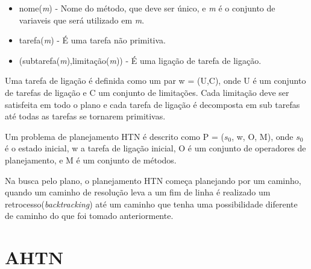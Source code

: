 \begin{itemize}
	\item nome(\textit{m}) - Nome do método, que deve ser único, e \textit{m} é o conjunto de variaveis que será utilizado em \textit{m}. 
	\item tarefa(\textit{m}) - É uma tarefa não primitiva.
	\item (subtarefa(\textit{m}),limitação(\textit{m})) - É uma ligação de tarefa de ligação.
\end{itemize}

Uma tarefa de ligação é definida como um par w = (U,C), onde U é um conjunto de tarefas de ligação e C um conjunto de limitações. Cada limitação deve ser satisfeita em todo o plano e cada tarefa de ligação é decomposta em sub tarefas até todas as tarefas se tornarem primitivas. 

Um problema de planejamento HTN é descrito como P = ($s_{0}$, w, O, M), onde $s_{0}$ é o estado inicial, w a tarefa de ligação inicial, O é um conjunto de operadores de planejamento, e M é um conjunto de métodos. 

Na busca pelo plano, o planejamento HTN começa planejando por um caminho, quando um caminho de resolução leva a um fim de linha é realizado um retrocesso(\textit{backtracking}) até um caminho que tenha uma possibilidade diferente de caminho do que foi tomado anteriormente.


\section{AHTN} 

